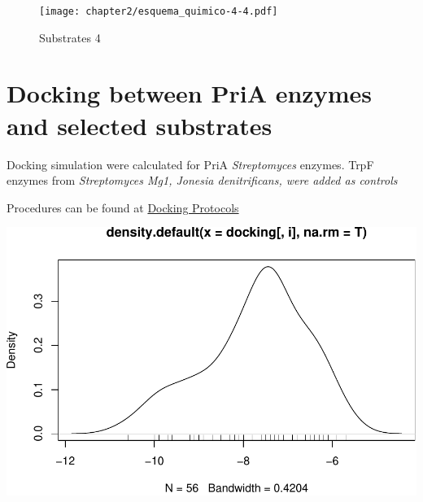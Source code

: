 \documentclass[12pt,twoside]{reedthesis}
\begin{document}
  \begin{figure}[h!tbp]
   \centering
   \texttt{[image: chapter2/esquema\_quimico-4-4.pdf]}
   \caption[Substrates 4]{\normalsize{Substrates 4}}
   \label{fig:Substrates chemical 4}
   \end{figure}
  
  \section{Docking between PriA enzymes and selected
  substrates}\label{docking-between-pria-enzymes-and-selected-substrates}
  
  Docking simulation were calculated for PriA \emph{Streptomyces} enzymes.
  TrpF enzymes from \emph{Streptomyces Mg1, Jonesia denitrificans, were
  added as controls}
  
  Procedures can be found at
  \href{https://github.com/tripplab/Docking/wiki}{Docking Protocols}
  
  \begin{Shaded}
  \begin{Highlighting}[]
  \StringTok{ }\NormalTok{(}\NormalTok{, }\NormalTok{, }\NormalTok{)}
  
  \NormalTok{:}\NormalTok{)}
  \NormalTok{\{}\NormalTok{(}\NormalTok{()\}}
  \end{Highlighting}
  \end{Shaded}
  
  \begin{center}\includegraphics{tesis_files/figure-latex/johan-1} \end{center}
  
\end{document}
